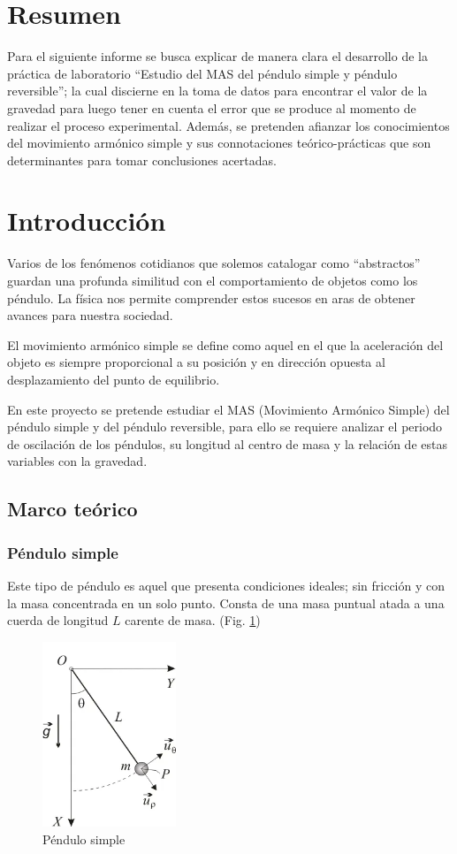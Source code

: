 \documentclass[spanish,notitlepage,letterpaper, 12pt]{article}
\begin{document}

\tableofcontents

\newpage

\section{Resumen}
Para el siguiente informe se busca explicar de manera clara el desarrollo de la práctica de laboratorio “Estudio del MAS del péndulo simple y péndulo reversible”; la cual discierne en la toma de datos para encontrar el valor de la gravedad para luego tener en cuenta el error que se produce al momento de realizar el proceso experimental. Además, se pretenden afianzar los conocimientos del movimiento armónico simple y sus connotaciones teórico-prácticas que son determinantes para tomar conclusiones acertadas.  

\section{Introducción}
Varios de los fenómenos cotidianos que solemos catalogar como \enquote{abstractos} guardan una profunda similitud con el comportamiento de objetos como los péndulo. La física nos permite comprender estos sucesos en aras de obtener avances para nuestra sociedad. \par
\bigskip
El movimiento armónico simple se define como aquel en el que la aceleración del objeto es siempre proporcional a su posición y en dirección opuesta al desplazamiento del punto de equilibrio. \cite{serway_jewett_2017} \par
\bigskip
En este proyecto se pretende estudiar el MAS (Movimiento Armónico Simple) del péndulo simple y del péndulo reversible, para ello se requiere analizar el periodo de oscilación de los péndulos, su longitud al centro de masa y la relación de estas variables con la gravedad.
\subsection{Marco teórico} \label{I.MT}
\subsubsection{Péndulo simple}
Este tipo de péndulo es aquel que presenta condiciones ideales; sin fricción y con la masa concentrada en un solo punto. Consta de una masa puntual atada a una cuerda de longitud $L$ carente de masa. (Fig. \ref{Figura 1}) 

\begin{figure}[ht]
    \centering
    \includegraphics[width=4.0cm]{images/Pendulo-simple.png}
    \caption{Péndulo simple}
    \label{Figura 1}
\end{figure}
    
\end{document}
